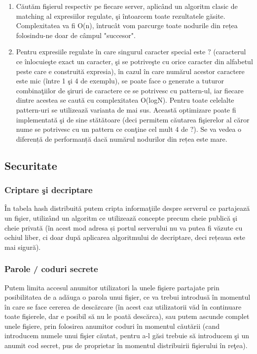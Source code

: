 \documentclass[runningheads]{llncs}
\begin{document}
\begin{enumerate}
	\item Căutăm fişierul respectiv pe fiecare server, aplicând un algoritm clasic de matching al expresiilor regulate, şi întoarcem toate rezultatele găsite. Complexitatea va fi O(n), întrucât vom parcurge toate nodurile din rețea folosindu-ne doar de câmpul "succesor".
	\item Pentru expresiile regulate în care singurul caracter special este $?$ (caracterul ce înlocuieşte exact un caracter, şi se potriveşte cu orice caracter din alfabetul peste care e construită expresia), în cazul în care numărul acestor caractere este mic (între 1 şi 4 de exemplu), se poate face o generate a tuturor combinaţiilor de şiruri de caractere ce se potrivesc cu pattern-ul, iar fiecare dintre acestea se caută cu complexitatea O(logN). Pentru toate celelalte pattern-uri se utilizează varianta de mai sus. Această optimizare poate fi implementată şi de sine stătătoare (deci permitem căutarea fişierelor al căror nume se potrivesc cu un pattern ce conţine cel mult 4 de $?$). Se va vedea o diferență de performanță dacă numărul nodurilor din rețea este mare.
\end{enumerate}

\subsection{Securitate}

\subsubsection{Criptare şi decriptare}

În tabela hash distribuită putem cripta informaţiile despre serverul ce partajează un fişier, utilizând un algoritm ce utilizează concepte precum cheie publică şi cheie privată (în acest mod adresa și portul serverului nu va putea fi văzute cu ochiul liber, ci doar după aplicarea algoritmului de decriptare, deci rețeaua este mai sigură).

\subsubsection{Parole / coduri secrete}

Putem limita accesul anumitor utilizatori la unele fişiere partajate prin posibilitatea de a adăuga o parola unui fişier, ce va trebui introdusă în momentul în care se face cererea de descărcare (în acest caz utilizatorii văd în continuare toate fişierele, dar e posibil să nu le poată descărca), sau putem ascunde complet unele fişiere, prin folosirea anumitor coduri în momentul căutării (cand introducem numele unui fişier căutat, pentru a-l găsi trebuie să introducem şi un anumit cod secret, pus de proprietar în momentul distribuirii fişierului în reţea).
\end{document}
